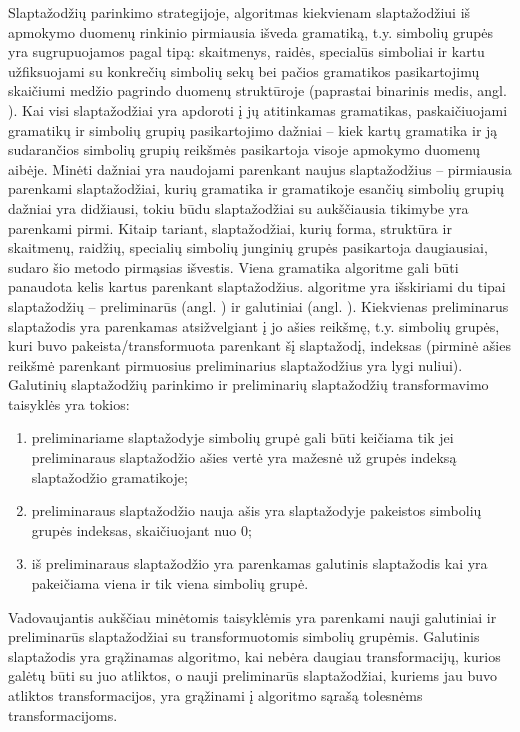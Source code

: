 \documentclass{VUMIFInfBakalaurinis}
\begin{document}
 \label{sec:pcfgalg}
Slaptažodžių parinkimo strategijoje,  algoritmas kiekvienam 
slaptažodžiui iš apmokymo duomenų rinkinio pirmiausia išveda gramatiką, t.y. 
simbolių grupės yra sugrupuojamos pagal tipą: skaitmenys, raidės, specialūs 
simboliai ir kartu užfiksuojami su konkrečių simbolių sekų bei pačios gramatikos 
pasikartojimų skaičiumi medžio pagrindo duomenų struktūroje (paprastai binarinis 
medis, angl. ). Kai visi slaptažodžiai yra apdoroti į jų 
atitinkamas gramatikas, paskaičiuojami gramatikų ir simbolių grupių 
pasikartojimo dažniai -- kiek kartų gramatika ir ją sudarančios simbolių grupių 
reikšmės pasikartoja visoje apmokymo duomenų aibėje. Minėti dažniai yra 
naudojami parenkant naujus slaptažodžius -- pirmiausia parenkami slaptažodžiai, 
kurių gramatika ir gramatikoje esančių simbolių grupių dažniai yra didžiausi, 
tokiu būdu slaptažodžiai su aukščiausia tikimybe yra parenkami pirmi. Kitaip 
tariant, slaptažodžiai, kurių forma, struktūra ir skaitmenų, raidžių, specialių 
simbolių junginių grupės pasikartoja daugiausiai, sudaro šio metodo pirmąsias 
išvestis.
Viena gramatika  algoritme gali būti panaudota kelis kartus 
parenkant slaptažodžius.  algoritme yra išskiriami du tipai 
slaptažodžių -- preliminarūs (angl. ) ir galutiniai 
(angl. ). Kiekvienas preliminarus slaptažodis yra parenkamas 
atsižvelgiant į jo ašies reikšmę, t.y. simbolių grupės, kuri buvo 
pakeista/transformuota parenkant šį slaptažodį, indeksas (pirminė ašies reikšmė 
parenkant pirmuosius preliminarius slaptažodžius yra lygi nuliui). Galutinių 
slaptažodžių parinkimo ir preliminarių slaptažodžių transformavimo taisyklės yra 
tokios:
\begin{enumerate}
  \item preliminariame slaptažodyje simbolių grupė gali būti keičiama tik jei 
    preliminaraus slaptažodžio ašies vertė yra mažesnė už grupės indeksą 
    slaptažodžio gramatikoje;
  \item preliminaraus slaptažodžio nauja ašis yra slaptažodyje pakeistos 
    simbolių grupės indeksas, skaičiuojant nuo 0;
  \item iš preliminaraus slaptažodžio yra parenkamas galutinis slaptažodis kai 
    yra pakeičiama viena ir tik viena simbolių grupė.
\end{enumerate}

Vadovaujantis aukščiau minėtomis taisyklėmis yra parenkami nauji galutiniai ir 
preliminarūs slaptažodžiai su transformuotomis simbolių grupėmis. Galutinis 
slaptažodis yra grąžinamas algoritmo, kai nebėra daugiau transformacijų, kurios 
galėtų būti su juo atliktos, o nauji preliminarūs slaptažodžiai, kuriems jau 
buvo atliktos transformacijos, yra grąžinami į algoritmo sąrašą tolesnėms 
transformacijoms.
\end{document}
